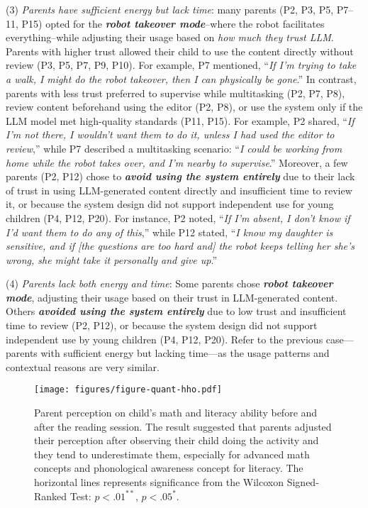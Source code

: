 (3) \textit{Parents have sufficient energy but lack time}: many parents (P2, P3, P5, P7--11, P15) opted for the \textit{\textbf{robot takeover mode}}--where the robot facilitates everything--while adjusting their usage based on \textit{how much they trust LLM}. Parents with higher trust allowed their child to use the content directly without review (P3, P5, P7, P9, P10). For example, P7 mentioned, ``\textit{If I'm trying to take a walk, I might do the robot takeover, then I can physically be gone}.'' In contrast, parents with less trust preferred to supervise while multitasking (P2, P7, P8), review content beforehand using the editor (P2, P8), or use the system only if the LLM model met high-quality standards (P11, P15). For example, P2 shared, ``\textit{If I'm not there, I wouldn't want them to do it, unless I had used the editor to review},'' while P7 described a multitasking scenario: ``\textit{I could be working from home while the robot takes over, and I'm nearby to supervise}.'' Moreover, a few parents (P2, P12) chose to \textit{\textbf{avoid using the system entirely}} due to their lack of trust in using LLM-generated content directly and insufficient time to review it, or because the system design did not support independent use for young children (P4, P12, P20). For instance, P2 noted, ``\textit{If I'm absent, I don't know if I'd want them to do any of this},'' while P12 stated, ``\textit{I know my daughter is sensitive, and if [the questions are too hard and] the robot keeps telling her she's wrong, she might take it personally and give up}.''

(4) \textit{Parents lack both energy and time}: Some parents chose \textit{\textbf{robot takeover mode}}, adjusting their usage based on their trust in LLM-generated content. Others \textit{\textbf{avoided using the system entirely}} due to low trust and insufficient time to review (P2, P12), or because the system design did not support independent use by young children (P4, P12, P20). Refer to the previous case—parents with sufficient energy but lacking time—as the usage patterns and contextual reasons are very similar.

\begin{figure*}[!t]
  \texttt{[image: figures/figure-quant-hho.pdf]}
  \caption{Parent perception on child's math and literacy ability before and after the reading session. The result suggested that parents adjusted their perception after observing their child doing the activity and they tend to underestimate them, especially for advanced math concepts and phonological awareness concept for literacy. The horizontal lines represents significance from the Wilcoxon Signed-Ranked Test: $p < .01^{**}$, $p < .05^{*}$.}
  \label{fig:quant-result}
   \vspace*{-10pt}
\end{figure*}

